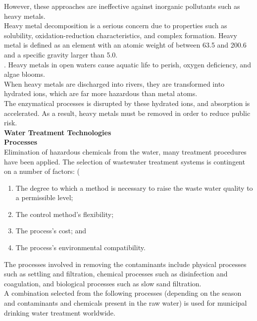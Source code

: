 \documentclass{article}
\begin{document}
However, these approaches are ineffective against inorganic pollutants such as heavy metals. \\
Heavy metal decomposition is a serious concern due to properties such as solubility, oxidation-reduction characteristics, and complex formation. Heavy metal is defined as an element with an atomic weight of between 63.5 and 200.6 and a specific gravity larger than 5.0.\\.
Heavy metals in open waters cause aquatic life to perish, oxygen deficiency, and algae blooms. \\
When heavy metals are discharged into rivers, they are transformed into hydrated ions, which are far more hazardous than metal atoms. 
\\The enzymatical processes is disrupted by these hydrated ions, and absorption is accelerated. As a result, heavy metals must be removed in order to reduce public risk.\\
\textbf{Water Treatment Technologies}\\
\textbf{Processes}\\
Elimination of hazardous chemicals from the water, many treatment procedures have been applied. The selection of wastewater treatment systems is contingent on a number of factors: (
\begin{enumerate}
\item The degree to which a method is necessary to raise the waste water quality to a permissible level; 
\item The control method's flexibility;
\item The process's cost; and
\item The process's environmental compatibility.\\
\end{enumerate}
The processes involved in removing the contaminants include physical processes such as settling and filtration, chemical processes such as disinfection and coagulation, and biological processes such as slow sand filtration.\\
A combination selected from the following processes (depending on the season and contaminants and chemicals present in the raw water) is used for municipal drinking water treatment worldwide.\\
\end{document}
